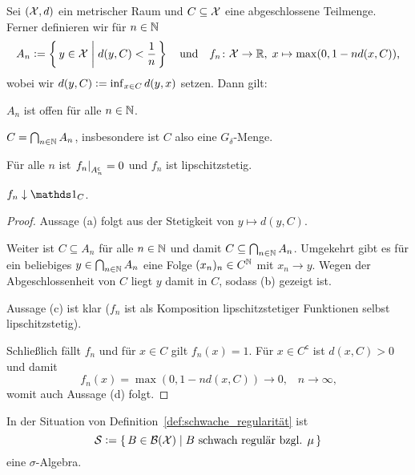 \documentclass[../thesis/thesis.tex]{subfiles}
\begin{document}
	\begin{Hilfssatz}
		\label{hilfssatz:offene_mengen}
		Sei $(\mathcal{X}, d)$ ein metrischer Raum und $C \subseteq \mathcal{X}$ eine abgeschlossene 
		Teilmenge. Ferner definieren wir für $n \in \mathbb{N}$
		$$ A_n \vcentcolon = \left\{\, y \in \mathcal{X} \; \middle| \; d(y, C) < \frac{1}{n} \,\right\} \quad \text{und} \quad 
		f_n \colon \mathcal{X} \to \mathbb{R}, \; x \mapsto \max (0, 1-n d(x, C))  \text{,}$$
		wobei wir $d(y, C) \vcentcolon = \inf_{x \in C} d(y, x)$ setzen.
		Dann gilt:
		\begin{enumeratethm}
			\item $A_n$ ist offen für alle $n \in \mathbb{N}$.
			\item $C = \bigcap_{n \in \mathbb{N}} A_n$, insbesondere ist $C$ also eine $G_\delta$-Menge.
			\item Für alle $n$ ist $\left.f_n\right|_{A_n^\mathsf{c}} = 0$ und $f_n$ ist lipschitzstetig.
			\item $f_n \convdown \indfct_C$.
		\end{enumeratethm}
	\end{Hilfssatz}
	
	\begin{proof}
		Aussage (a) folgt aus der Stetigkeit von $y \mapsto d(y, C)$.
		
		Weiter ist $C \subseteq A_n$ für alle $n \in \mathbb{N}$ und damit 
		$C \subseteq \bigcap_{n \in \mathbb{N}} A_n$. 
		Umgekehrt gibt es für ein beliebiges $y \in \bigcap_{n \in \mathbb{N}} A_n$
		eine Folge $(x_n)_n \in C^{\mathbb{N}}$ mit $x_n \rightarrow y$. 
		Wegen der Abgeschlossenheit von $C$ liegt $y$ damit in $C$, sodass (b) gezeigt ist.
		
		Aussage (c) ist klar ($f_n$ ist als Komposition 
		lipschitzstetiger Funktionen selbst lipschitzstetig).
		
		Schließlich fällt $f_n$ und für $x \in C$ gilt $f_n(x) = 1$. 
		Für $x \in C^\mathsf{c}$ ist $d(x, C) > 0$ und damit
		$$f_n(x) = \max (0, 1-n d(x, C))
		\to 0 \text{,} \quad n \to \infty \text{,}$$
		womit auch Aussage (d) folgt.
	\end{proof}
	
	\begin{Hilfssatz}
		\label{hilfssatz:schwach_reguläre_mengen_sigma_algebra}
		In der Situation von Definition~\ref{def:schwache_regularität} ist
		$$\mathcal{S} \vcentcolon = \left\{\, B \in \mathcal{B}(\mathcal{X}) \; \middle| \; B \text{ schwach regulär bzgl. } \mu \,\right\}$$
		eine $\sigma$-Algebra.
	\end{Hilfssatz}
	
\end{document}
